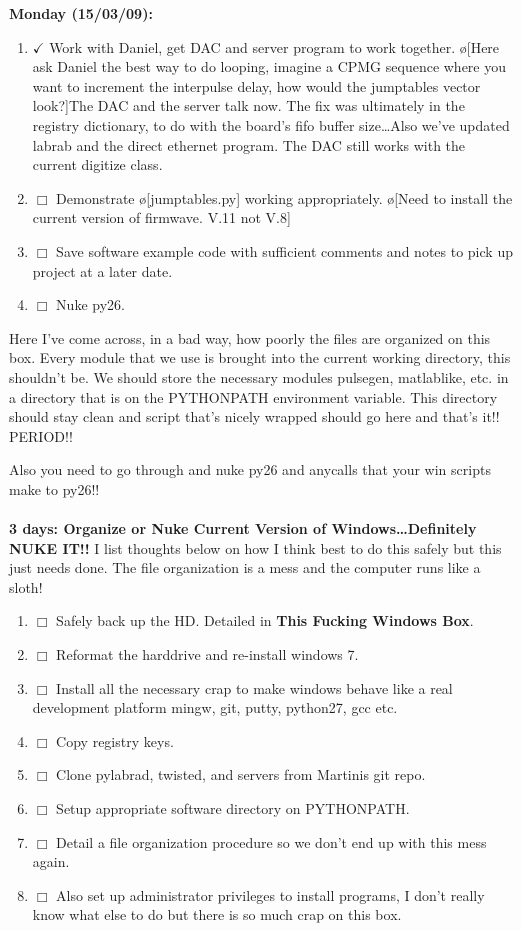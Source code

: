 \documentclass[10pt]{book}
\begin{document}
{{\bf Monday (15/03/09):}
\begin{enumerate}
    \item $\checkmark$ Work with Daniel, get DAC and server program to work together. \o[Here ask Daniel the best way to do looping, imagine a CPMG sequence where you want to increment the interpulse delay, how would the jumptables vector look?]{The DAC and the server talk now. The fix was ultimately in the registry dictionary, to do with the board's fifo buffer size\ldots Also we've updated labrab and the direct ethernet program. The DAC still works with the current digitize class.} 
    \item $\Box$ Demonstrate \o[jumptables.py]{} working appropriately. \o[Need to install the current version of firmwave. V.11 not V.8]{}
    \item $\Box$ Save software example code with sufficient comments and notes to pick up project at a later date. \\
    \item $\Box$ Nuke py26.
\end{enumerate} 
Here I've come across, in a bad way, how poorly the files are organized on this box. Every module that we use is brought into the current working directory, this shouldn't be. We should store the necessary modules pulsegen, matlablike, etc. in a directory that is on the PYTHONPATH environment variable. This directory should stay clean and script that's nicely wrapped should go here and that's it!! PERIOD!!

Also you need to go through and nuke py26 and anycalls that your win scripts make to py26!! \\ \\

{\bf 3 days: Organize or Nuke Current Version of Windows\ldots Definitely NUKE IT!!}
I list thoughts below on how I think best to do this safely but this just needs done. The file organization is a mess and the computer runs like a sloth!
\begin{enumerate}
    \item $\Box$ Safely back up the HD. Detailed in {\bf This Fucking Windows Box}.
    \item $\Box$ Reformat the harddrive and re-install windows 7.
    \item $\Box$ Install all the necessary crap to make windows behave like a real development platform mingw, git, putty, python27, gcc etc.
    \item $\Box$ Copy registry keys.
    \item $\Box$ Clone pylabrad, twisted, and servers from Martinis git repo.
    \item $\Box$ Setup appropriate software directory on PYTHONPATH.
    \item $\Box$ Detail a file organization procedure so we don't end up with this mess again.
    \item $\Box$ Also set up administrator privileges to install programs, I don't really know what else to do but there is so much crap on this box.\\
\end{enumerate}


}
\end{document}
